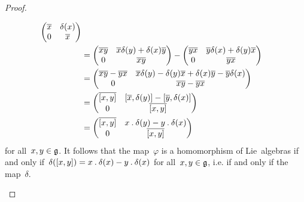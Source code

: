 \begin{proof}
\begin{enumerate}
\begin{align*}
\begin{pmatrix}
					\overline{x} & \delta(x) \\
					0         & \overline{x}
				\end{pmatrix}
				\\
				&=
				\begin{pmatrix}
					\overline{xy}  & \overline{x} \delta(y) + \delta(x) \overline{y} \\
					0           & \overline{xy}
				\end{pmatrix}
				-
				\begin{pmatrix}
					\overline{yx}  & \overline{y} \delta(x) + \delta(y) \overline{x} \\
					0           & \overline{yx}
				\end{pmatrix}
				\\
				&=
				\begin{pmatrix}
					\overline{x}\overline{y} - \overline{y}\overline{x} & \overline{x} \delta(y) - \delta(y) \overline{x} + \delta(x) \overline{y} - \overline{y} \delta(x) \\
					0                                       & \overline{x}\overline{y} - \overline{y}\overline{x}
				\end{pmatrix}
				\\
				&=
				\begin{pmatrix}
					\overline{[x,y]} & [\overline{x}, \delta(y)] - [\overline{y}, \delta(x)] \\
					0             & \overline{[x,y]}
				\end{pmatrix}
				\\
				&=
				\begin{pmatrix}
					\overline{[x,y]} & x \mathbin{.} \delta(y) -  y \mathbin{.} \delta(x) \\
					0             & \overline{[x,y]}
				\end{pmatrix}
			\end{align*}
			for all~$x, y \in \mathfrak{g}$.
			It follows that the map~$\varphi$ is a homomorphism of Lie~algebras if and only if~$\delta([x,y]) = x \mathbin{.} \delta(x) - y \mathbin{.} \delta(x)$ for all~$x, y \in \mathfrak{g}$, i.e. if and only if the map~$\delta$.
		\qedhere
	\end{enumerate}
\end{proof}


